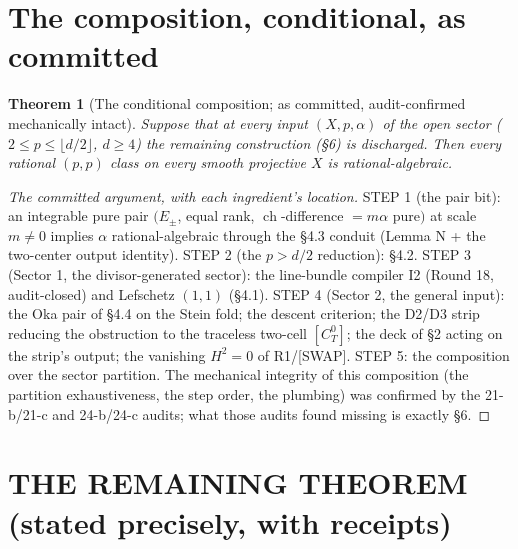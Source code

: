 \documentclass[11pt]{article}
\newtheorem{theorem}{Theorem}
\newcommand{\ch}{\operatorname{ch}}
\begin{document}
\section{The composition, conditional, as committed}

\begin{theorem}[The conditional composition; as committed, audit-confirmed
mechanically intact]
Suppose that at every input $(X,p,\alpha)$ of the open sector
($2\le p\le\lfloor d/2\rfloor$, $d\ge4$) the remaining construction
(\S6) is discharged. Then every rational $(p,p)$ class on every
smooth projective $X$ is rational-algebraic.
\end{theorem}

\begin{proof}[The committed argument, with each ingredient's location]
STEP 1 (the pair bit): an integrable pure pair $(E_\pm$, equal rank,
$\ch$-difference $=m\alpha$ pure$)$ at scale $m\ne0$ implies
$\alpha$ rational-algebraic through the \S4.3 conduit
(Lemma N + the two-center output identity). STEP 2 (the $p>d/2$
reduction): \S4.2. STEP 3 (Sector 1, the divisor-generated sector):
the line-bundle compiler I2 (Round 18, audit-closed) and Lefschetz
$(1,1)$ (\S4.1). STEP 4 (Sector 2, the general input): the Oka pair of
\S4.4 on the Stein fold; the descent criterion; the D2/D3 strip
reducing the obstruction to the traceless two-cell
$[C_T^0]$; the deck of \S2 acting on the strip's output; the
vanishing $H^2=0$ of R1/[SWAP]. STEP 5: the composition over the
sector partition. The mechanical integrity of this composition
(the partition exhaustiveness, the step order, the plumbing) was
confirmed by the 21-b/21-c and 24-b/24-c audits; what those audits
found missing is exactly \S6.
\end{proof}

\section{THE REMAINING THEOREM (stated precisely, with receipts)}
\end{document}
